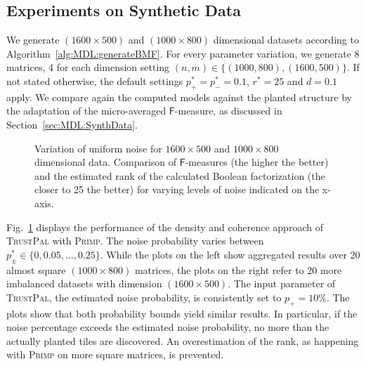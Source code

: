 \subsection{Experiments on Synthetic Data}
We generate $(1600\times 500)$ and $(1000\times 800)$ dimensional datasets according to Algorithm~\ref{alg:MDL:generateBMF}. For every parameter variation, we generate 8 matrices, 4 for each dimension setting $(n,m)\in\{(1000,800),(1600,500)\}$. If not stated otherwise, the default settings $p_+^*=p_-^*=0.1$, $r^*=25$ and $d=0.1$ apply. 
We compare again the computed models against the planted structure by the adaptation of the micro-averaged $\mathsf{F}$-measure, as discussed in Section~\ref{sec:MDL:SynthData}.
\begin{figure}[t]
\centering

\caption{Variation of uniform noise for $1600\times 500$ and $1000\times 800$ dimensional data. Comparison of $\mathsf{F}$-measures (the higher the better) and the estimated rank of the calculated Boolean factorization (the closer to 25 the better) for varying levels of noise indicated on the x-axis.}
\label{fig:TP:noise}
\end{figure}

Fig.~\ref{fig:TP:noise} displays the performance of the density and coherence approach of \textsc{TrustPal} with \textsc{Primp}. The noise probability varies between $p_\pm^*\in\{0,0.05,\ldots,0.25\}$. While the plots on the left show aggregated results over 20 almost square $(1000\times 800)$ matrices, the plots on the right refer to 20 more imbalanced datasets with dimension $(1600\times 500)$. The input parameter of \textsc{TrustPal}, the estimated noise probability, is consistently set to $p_+=10\%$. The plots show that both probability bounds yield similar results. In particular, if the noise percentage exceeds the estimated noise probability, no more than the actually planted tiles are discovered. An overestimation of the rank, as happening with \textsc{Primp} on more square matrices, is prevented. 

